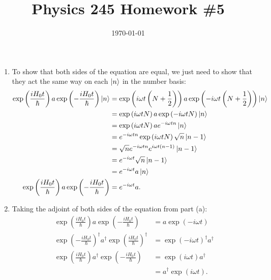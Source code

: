 \documentclass{article}
\date{\today}
\title{Physics 245 Homework \#5}
\begin{document}
\maketitle

\begin{prob}
\end{prob}
\begin{enumerate}[label=(\alph*)]
    \item To show that both sides of the equation are equal, we just need to show that they act the same way on each $\left\lvert n \right\rangle$ in the number basis:
        \begin{align*}
            \exp \left( \frac{i H_0 t}{\hbar} \right) a \exp \left( - \frac{i H_0 t}{\hbar} \right) \left\lvert n \right\rangle &= \exp \left( i \omega t \left( N+ \frac{1}{2} \right) \right) a \exp \left( -i \omega t \left( N + \frac{1}{2} \right) \right) \left\lvert n \right\rangle \\
                                                                                                            &= \exp \left( i \omega t N \right) a \exp \left( -i \omega t N \right) \left\lvert n \right\rangle \\
                                                                                                            &= \exp \left( i \omega t N \right) a e^{-i \omega t n} \left\lvert n \right\rangle \\
                                                                                                            &= e^{-i \omega t n} \exp \left( i \omega t N \right) \sqrt{n} \left\lvert n-1 \right\rangle \\
                                                                                                            &= \sqrt{n} e^{-i \omega t n} e^{i \omega t (n-1)} \left\lvert n-1 \right\rangle \\
                                                                                                            &= e^{-i \omega t} \sqrt{n} \left\lvert n-1 \right\rangle \\
                                                                                                            &= e^{-i \omega t} a \left\lvert n \right\rangle \\
            \exp \left( \frac{i H_0 t}{\hbar} \right) a \exp \left( - \frac{i H_0 t}{\hbar} \right) &=e^{-i \omega t} a.
        \end{align*}
\item Taking the adjoint of both sides of the equation from part (a):
    \begin{align*}
        \exp \left( \frac{i H_0 t}{\hbar} \right) a \exp \left( - \frac{i H_0 t}{\hbar} \right) &= a \exp \left( -i \omega t \right) \\
        \exp \left( -\frac{i H_0 t}{\hbar} \right)^\dag a^\dag \exp \left( \frac{i H_0 t}{\hbar} \right)^\dag &= \exp \left( -i \omega t \right)^\dag a^\dag \\
        \exp \left( \frac{i H_0 t}{\hbar} \right) a^\dag \exp \left( - \frac{i H_0 t}{\hbar} \right) &= \exp \left( i \omega t \right) a^\dag \\
                                                                                                     &= a^\dag \exp \left( i \omega t \right).
    \end{align*}
\end{enumerate}
\end{document}
